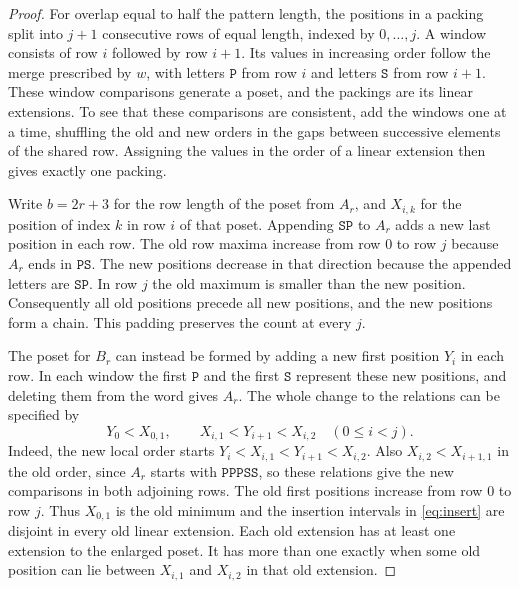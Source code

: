 \documentclass[11pt]{amsart}
\newcommand{\word}[1]{\mathtt{#1}}
\begin{document}
\begin{proof}
For overlap equal to half the pattern length, the positions in a packing split into $j+1$ consecutive rows of equal length, indexed by $0,\ldots,j$. A window consists of row $i$ followed by row $i+1$. Its values in increasing order follow the merge prescribed by $w$, with letters $\word{P}$ from row $i$ and letters $\word{S}$ from row $i+1$. These window comparisons generate a poset, and the packings are its linear extensions. To see that these comparisons are consistent, add the windows one at a time, shuffling the old and new orders in the gaps between successive elements of the shared row. Assigning the values in the order of a linear extension then gives exactly one packing.

Write $b=2r+3$ for the row length of the poset from $A_r$, and $X_{i,k}$ for the position of index $k$ in row $i$ of that poset. Appending $\word{SP}$ to $A_r$ adds a new last position in each row. The old row maxima increase from row $0$ to row $j$ because $A_r$ ends in $\word{PS}$. The new positions decrease in that direction because the appended letters are $\word{SP}$. In row $j$ the old maximum is smaller than the new position. Consequently all old positions precede all new positions, and the new positions form a chain. This padding preserves the count at every $j$.

The poset for $B_r$ can instead be formed by adding a new first position $Y_i$ in each row. In each window the first $\word{P}$ and the first $\word{S}$ represent these new positions, and deleting them from the word gives $A_r$. The whole change to the relations can be specified by
\begin{equation}\label{eq:insert}
 Y_0<X_{0,1},\qquad X_{i,1}<Y_{i+1}<X_{i,2}\quad(0\le i<j).
\end{equation}
Indeed, the new local order starts $Y_i<X_{i,1}<Y_{i+1}<X_{i,2}$. Also $X_{i,2}<X_{i+1,1}$ in the old order, since $A_r$ starts with $\word{PPPSS}$, so these relations give the new comparisons in both adjoining rows. The old first positions increase from row $0$ to row $j$. Thus $X_{0,1}$ is the old minimum and the insertion intervals in \eqref{eq:insert} are disjoint in every old linear extension. Each old extension has at least one extension to the enlarged poset. It has more than one exactly when some old position can lie between $X_{i,1}$ and $X_{i,2}$ in that old extension.


\end{proof}
\end{document}
